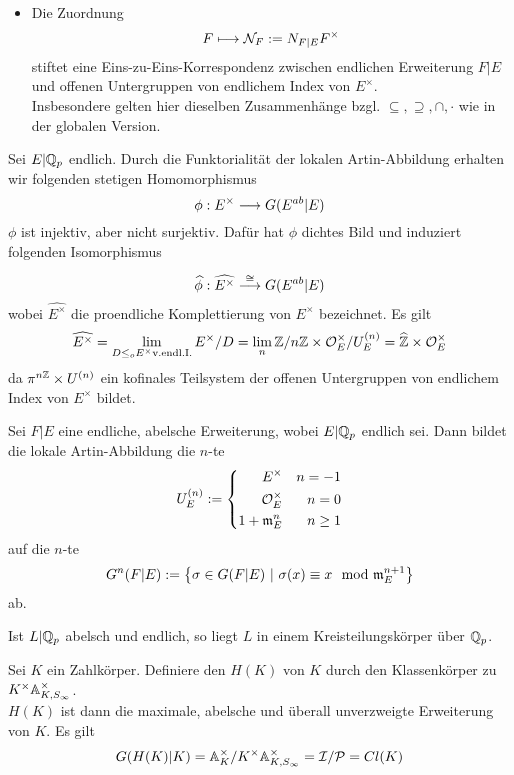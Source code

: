 \begin{itemize}
\begin{itemize}
\begin{center}
\end{center}
\end{itemize}
\item Die Zuordnung
\[ F \longmapsto \mathcal{N}_F := N_{F|E}F^\times \]
stiftet eine Eins-zu-Eins-Korrespondenz zwischen endlichen Erweiterung $F|E$ und offenen Untergruppen von endlichem Index von $E^\times$.\\
Insbesondere gelten hier dieselben Zusammenhänge bzgl. $\subseteq, \supseteq, \cap, \cdot$ wie in der globalen Version.
\end{itemize}
Sei $E|\mathbb{Q}_p$ endlich. Durch die Funktorialität der lokalen Artin-Abbildung erhalten wir folgenden stetigen Homomorphismus
\[ \phi : E^\times \overset{}{\longrightarrow} G(E^{ab}|E) \]
$\phi$ ist injektiv, aber nicht surjektiv. Dafür hat $\phi$ dichtes Bild und induziert folgenden Isomorphismus
\[ \widehat{\phi}:\widehat{E^\times} \overset{\overset{}{\cong}}{\longrightarrow} G(E^{ab}|E) \]
wobei $\widehat{E^\times}$ die proendliche Komplettierung von $E^\times$ bezeichnet. Es gilt
\[ \widehat{E^\times} = \lim\limits_{D\leq_o E^\times \text{v.endl.I.}}E^\times / D =\lim\limits_{n} \mathbb{Z}/n\mathbb{Z} \times \mathcal{O}^\times_{E}/U^{(n)}_E = \widehat{\mathbb{Z}} \times \mathcal{O}_E^\times \]
da $\pi^{n\mathbb{Z}} \times U^{(n)}$ ein kofinales Teilsystem der offenen Untergruppen von endlichem Index von $E^\times$ bildet.

\Satz{}
Sei $F|E$ eine endliche, abelsche Erweiterung, wobei $E|\mathbb{Q}_p$ endlich sei. Dann bildet die lokale Artin-Abbildung die $n$-te 
\[ U_E^{(n)} := \left\lbrace
\begin{aligned}
E^\times && n = -1\\
\mathcal{O}_E^\times && n= 0\\
1 + \mathfrak{m}_E^n && n\geq 1
\end{aligned}
\right. \]
auf die $n$-te 
\[ G^n(F|E) := \set{\sigma \in G(F|E)}{ \sigma(x) \equiv x \mod{} \mf_E^{n+1} }\]
ab.

Ist $L|\mathbb{Q}_p$ abelsch und endlich, so liegt $L$ in einem Kreisteilungskörper über $\mathbb{Q}_p$.

Sei $K$ ein Zahlkörper. Definiere den  $H(K)$ von $K$ durch den Klassenkörper zu $K^\times \mathbb{A}_{K,S_\infty}^\times$.\\
$H(K)$ ist dann die maximale, abelsche und überall unverzweigte Erweiterung von $K$. Es gilt
\[ G(H(K)|K) = \mathbb{A}_K^\times / K^\times \mathbb{A}_{K,S_\infty}^\times = \mathcal{I} / \mathcal{P} = Cl(K) \]

